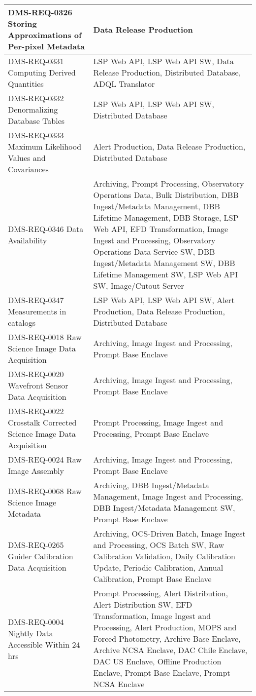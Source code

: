 \begin{longtable}{p{}p{}}
DMS-REQ-0326 Storing Approximations of Per-pixel Metadata & Data Release Production \\ \hline
DMS-REQ-0331 Computing Derived Quantities & LSP Web API, LSP Web API SW, Data Release Production, Distributed Database, ADQL Translator \\ \hline
DMS-REQ-0332 Denormalizing Database Tables & LSP Web API, LSP Web API SW, Distributed Database \\ \hline
DMS-REQ-0333 Maximum Likelihood Values and Covariances & Alert Production, Data Release Production, Distributed Database \\ \hline
DMS-REQ-0346 Data Availability & Archiving, Prompt Processing, Observatory Operations Data, Bulk Distribution, DBB Ingest/Metadata Management, DBB Lifetime Management, DBB Storage, LSP Web API, EFD Transformation, Image Ingest and Processing, Observatory Operations Data Service SW, DBB Ingest/Metadata Management SW, DBB Lifetime Management SW, LSP Web API SW, Image/Cutout Server \\ \hline
DMS-REQ-0347 Measurements in catalogs & LSP Web API, LSP Web API SW, Alert Production, Data Release Production, Distributed Database \\ \hline
DMS-REQ-0018 Raw Science Image Data Acquisition & Archiving, Image Ingest and Processing, Prompt Base Enclave \\ \hline
DMS-REQ-0020 Wavefront Sensor Data Acquisition & Archiving, Image Ingest and Processing, Prompt Base Enclave \\ \hline
DMS-REQ-0022 Crosstalk Corrected Science Image Data Acquisition & Prompt Processing, Image Ingest and Processing, Prompt Base Enclave \\ \hline
DMS-REQ-0024 Raw Image Assembly & Archiving, Image Ingest and Processing, Prompt Base Enclave \\ \hline
DMS-REQ-0068 Raw Science Image Metadata & Archiving, DBB Ingest/Metadata Management, Image Ingest and Processing, DBB Ingest/Metadata Management SW, Prompt Base Enclave \\ \hline
DMS-REQ-0265 Guider Calibration Data Acquisition & Archiving, OCS-Driven Batch, Image Ingest and Processing, OCS Batch SW, Raw Calibration Validation, Daily Calibration Update, Periodic Calibration, Annual Calibration, Prompt Base Enclave \\ \hline
DMS-REQ-0004 Nightly Data Accessible Within 24 hrs & Prompt Processing, Alert Distribution, Alert Distribution SW, EFD Transformation, Image Ingest and Processing, Alert Production, MOPS and Forced Photometry, Archive Base Enclave, Archive NCSA Enclave, DAC Chile Enclave, DAC US Enclave, Offline Production Enclave, Prompt Base Enclave, Prompt NCSA Enclave \\ \hline

\end{longtable}
